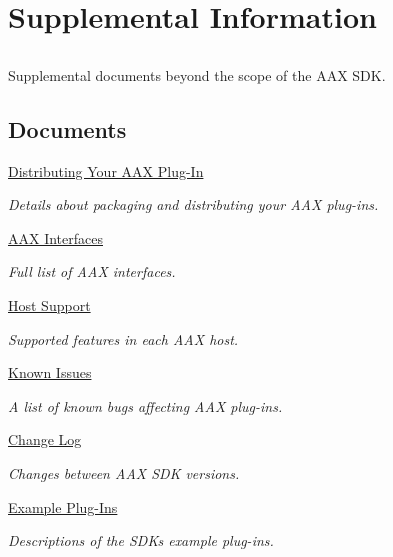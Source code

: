 \hypertarget{a00371}{}\section{Supplemental Information}
\label{a00371}


\subsection{ }
Supplemental documents beyond the scope of the A\+A\+X S\+D\+K. 

\subsection*{Documents}
\begin{DoxyCompactItemize}
\item 
\hyperlink{a00372}{Distributing Your A\+A\+X Plug-\/\+In}
\begin{DoxyCompactList}\small\item\em Details about packaging and distributing your A\+A\+X plug-\/ins. \end{DoxyCompactList}\item 
\hyperlink{a00003}{A\+A\+X Interfaces}
\begin{DoxyCompactList}\small\item\em Full list of A\+A\+X interfaces. \end{DoxyCompactList}\item 
\hyperlink{a00373}{Host Support}
\begin{DoxyCompactList}\small\item\em Supported features in each A\+A\+X host. \end{DoxyCompactList}\item 
\hyperlink{a00374}{Known Issues}
\begin{DoxyCompactList}\small\item\em A list of known bugs affecting A\+A\+X plug-\/ins. \end{DoxyCompactList}\item 
\hyperlink{a00375}{Change Log}
\begin{DoxyCompactList}\small\item\em Changes between A\+A\+X S\+D\+K versions. \end{DoxyCompactList}\item 
\hyperlink{a00376}{Example Plug-\/\+Ins}
\begin{DoxyCompactList}\small\item\em Descriptions of the S\+D\+K\textquotesingle{}s example plug-\/ins. \end{DoxyCompactList}\end{DoxyCompactItemize}
